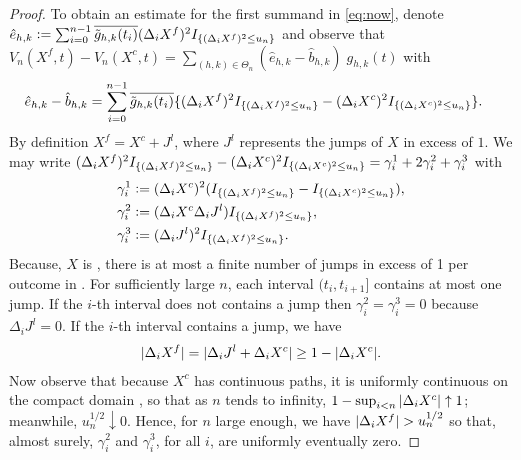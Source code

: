 \begin{proof}
To obtain an estimate for the first summand in \eqref{eq:now}, denote
    $\hat{e}_{h,k} := \sum_{i =0}^{n-1} \overline{\tilde{g}_{h,k}(t_i)} (\Delta_i X^f)^2I_{\{(\Delta_i X^f)^2 \le  u_n\}}$ 
  and observe that 
  $V_n(X^f,t)  - V_n(X^c, t) = \sum_{(h,k) \in \Theta_n} (\hat{e}_{h,k} - \hat{b}_{h,k})\;g_{h,k}(t)$ 
with 
\begin{align}
  \hat{e}_{h,k} - \hat{b}_{h,k}  &= \sum_{i =0}^{n-1} \overline{\tilde{g}_{h,k}(t_i)}\{ (\Delta_i X^f)^2 I_{\{(\Delta_i X^f)^2 \le u_n\}}- (\Delta_i X^c)^2 I_{\{(\Delta_i X^c)^2 \le u_n\}}\}.\notag
  \label{}
\end{align}
By definition $X^f = X^c + J^l$, where $J^l$ represents the jumps of $X$ in excess of $1$.  
We may write $ (\Delta_i X^f)^2 I_{\{(\Delta_i X^f)^2 \le u_n\}}- (\Delta_i X^c)^2 I_{\{(\Delta_i X^c)^2 \le u_n\}} = \gamma^1_i + 2\gamma^2_i + \gamma^3_i$ with 
  \begin{align}
  &\gamma^1_i := (\Delta_i X^c)^2 (I_{\{(\Delta_i X^f)^2 \le u_n\}}-  I_{\{(\Delta_i X^c)^2 \le u_n\}}), \notag \\
  &\gamma^2_i := (\Delta_i X^c \Delta_i J^l) I_{\{(\Delta_i X^f)^2 \le u_n\}}, \notag\\ 
  &\gamma^3_i := (\Delta_i J^l)^2 I_{\{(\Delta_i X^f)^2 \le u_n\}}. 
  \end{align}
Because, $X$ is \cadlag, there is at most a finite number of  jumps in excess of 1  per outcome in \domain. For sufficiently large $n$, each interval $(t_{i} , t_{i + 1}]$  contains at most one  jump.  If the $i$-th interval does not contains a jump    then $\gamma^2_i = \gamma^3_i = 0$ because $\Delta_i J^l= 0$.   If the $i$-th interval contains a jump, we have  
\begin{align}
  \vert\Delta_i X^f\vert = \vert\Delta_i J^l+ \Delta_i X^c\vert \ge 1 - \vert \Delta_i X^c \vert.\label{eq:well1}
\end{align}
Now observe that because $X^c$ has  continuous paths, it is uniformly continuous on the compact domain \domain, so that   as $n$ tends to infinity, $1 - \sup_{i < n}\vert \Delta_i X^c \vert \uparrow 1$;  meanwhile, $u_n^{1/2} \downarrow 0$. Hence, for $n$ large enough, we have $\vert \Delta_i X^f \vert > u_n^{1/2}$ so that, almost surely,  $\gamma^2_i$ and $\gamma_i^3$, for all $i$,  are uniformly  eventually zero.


\end{proof}
